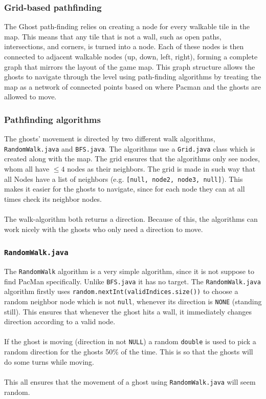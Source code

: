 \documentclass[a4paper,5pt]{article}
\begin{document}
\subsubsection{Grid-based pathfinding}
The Ghost path-finding relies on creating a node for every walkable tile in the map. This means that any tile that is not a wall, such as open paths, intersections, and corners, is turned into a node. Each of these nodes is then connected to adjacent walkable nodes (up, down, left, right), forming a complete graph that mirrors the layout of the game map. This graph structure allows the ghosts to navigate through the level using path-finding algorithms by treating the map as a network of connected points based on where Pacman and the ghosts are allowed to move.
\subsubsection{Pathfinding algorithms}
The ghosts' movement is directed by two different walk algorithms, \texttt{RandomWalk.java} and \texttt{BFS.java}. The algorithms use a \texttt{Grid.java} class which is created along with the map. The grid ensures that the algorithms only see nodes, whom all have $\leq4$ nodes as their neighbors. The grid is made in such way that all Nodes have a list of neighbors (e.g. \texttt{[null, node2, node3, null]}). This makes it easier for the ghosts to navigate, since for each node they can at all times check its neighbor nodes.\\\\ The walk-algorithm both returns a direction. Because of this, the algorithms can work nicely with the ghosts who only need a direction to move.
\subsubsection{\texttt{RandomWalk.java}}
The \texttt{RandomWalk} algorithm is a very simple algorithm, since it is not suppose to find PacMan specifically. Unlike \texttt{BFS.java} it has no target. The \texttt{RandomWalk.java} algorithm firstly uses \texttt{random.nextInt(validIndices.size())} to choose a random neighbor node which is not \texttt{null}, whenever its direction is \texttt{NONE} (standing still). This ensures that whenever the ghost hits a wall, it immediately changes direction according to a valid node.\\\\ If the ghost is moving (direction in not \texttt{NULL}) a random \texttt{double} is used to pick a random direction for the ghosts 50\% of the time. This is so that the ghosts will do some turns while moving.\\\\ This all ensures that the movement of a ghost using \texttt{RandomWalk.java} will seem random. 
\end{document}
